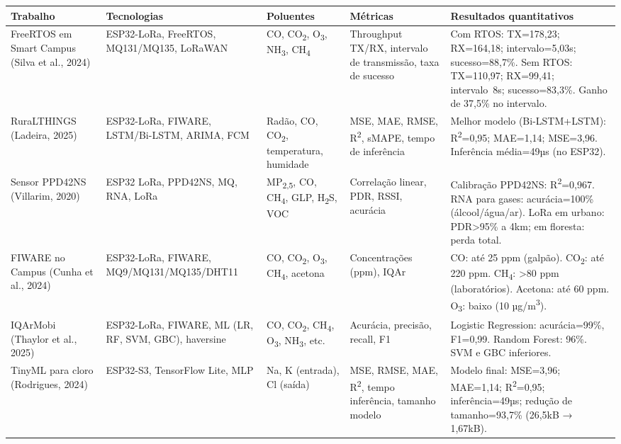 \documentclass[12pt,a4paper]{article}
\begin{document}
\begin{table}[H]
\centering
\small
\setlength{\tabcolsep}{6pt}
\begin{tabularx}{\textwidth}{|p{2.2cm}|p{2.2cm}|p{1.8cm}|p{2.5cm}|X|}
\hline
\textbf{Trabalho} & \textbf{Tecnologias} & \textbf{Poluentes} & \textbf{Métricas} & \textbf{Resultados quantitativos} \\
\hline
FreeRTOS em Smart Campus (Silva et al., 2024) & ESP32-LoRa, FreeRTOS, MQ131/MQ135, LoRaWAN & CO, CO\textsubscript{2}, O\textsubscript{3}, NH\textsubscript{3}, CH\textsubscript{4} & Throughput TX/RX, intervalo de transmissão, taxa de sucesso & Com RTOS: TX=178,23; RX=164,18; intervalo=5,03s; sucesso=88,7\%. Sem RTOS: TX=110,97; RX=99,41; intervalo~8s; sucesso=83,3\%. Ganho de 37,5\% no intervalo. \\
\hline
RuraLTHINGS (Ladeira, 2025) & ESP32-LoRa, FIWARE, LSTM/Bi-LSTM, ARIMA, FCM & Radão, CO, CO\textsubscript{2}, temperatura, humidade & MSE, MAE, RMSE, R\textsuperscript{2}, sMAPE, tempo de inferência & Melhor modelo (Bi-LSTM+LSTM): R\textsuperscript{2}=0,95; MAE=1,14; MSE=3,96. Inferência média=49µs (no ESP32). \\
\hline
Sensor PPD42NS (Villarim, 2020) & ESP32 LoRa, PPD42NS, MQ, RNA, LoRa & MP\textsubscript{2,5}, CO, CH\textsubscript{4}, GLP, H\textsubscript{2}S, VOC & Correlação linear, PDR, RSSI, acurácia & Calibração PPD42NS: R\textsuperscript{2}=0,967. RNA para gases: acurácia=100\% (álcool/água/ar). LoRa em urbano: PDR>95\% a 4km; em floresta: perda total. \\
\hline
FIWARE no Campus (Cunha et al., 2024) & ESP32-LoRa, FIWARE, MQ9/MQ131/MQ135/DHT11 & CO, CO\textsubscript{2}, O\textsubscript{3}, CH\textsubscript{4}, acetona & Concentrações (ppm), IQAr & CO: até 25 ppm (galpão). CO\textsubscript{2}: até 220 ppm. CH\textsubscript{4}: >80 ppm (laboratórios). Acetona: até 60 ppm. O\textsubscript{3}: baixo (10 µg/m\textsuperscript{3}). \\
\hline
IQArMobi (Thaylor et al., 2025) & ESP32-LoRa, FIWARE, ML (LR, RF, SVM, GBC), haversine & CO, CO\textsubscript{2}, CH\textsubscript{4}, O\textsubscript{3}, NH\textsubscript{3}, etc. & Acurácia, precisão, recall, F1 & Logistic Regression: acurácia=99\%, F1=0,99. Random Forest: 96\%. SVM e GBC inferiores. \\
\hline
TinyML para cloro (Rodrigues, 2024) & ESP32-S3, TensorFlow Lite, MLP & Na, K (entrada), Cl (saída) & MSE, RMSE, MAE, R\textsuperscript{2}, tempo inferência, tamanho modelo & Modelo final: MSE=3,96; MAE=1,14; R\textsuperscript{2}=0,95; inferência=49µs; redução de tamanho=93,7\% (26,5kB → 1,67kB). \\
\hline
\end{tabularx}
\end{table}
\end{document}
